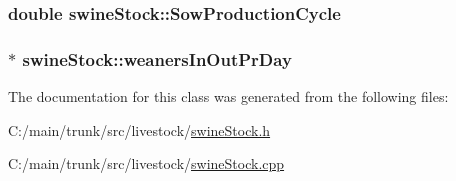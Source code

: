 \label{classswine_stock_a54c9ef8e2d53f01b1729b4ae95474dcb}
\hypertarget{classswine_stock_a30d8224d05f918effe9db2c8329245c6}{
\subsubsection[{SowProductionCycle}]{\setlength{\rightskip}{0pt plus 5cm}double {\bf swineStock::SowProductionCycle}}}
\label{classswine_stock_a30d8224d05f918effe9db2c8329245c6}
\hypertarget{classswine_stock_a57fbbfb80947a28f38fcda05d8bd8202}{
\subsubsection[{weanersInOutPrDay}]{$\ast$ {\bf swineStock::weanersInOutPrDay}}}
\label{classswine_stock_a57fbbfb80947a28f38fcda05d8bd8202}


The documentation for this class was generated from the following files:\begin{DoxyCompactItemize}
\item 
C:/main/trunk/src/livestock/\hyperlink{swine_stock_8h}{swineStock.h}\item 
C:/main/trunk/src/livestock/\hyperlink{swine_stock_8cpp}{swineStock.cpp}\end{DoxyCompactItemize}
